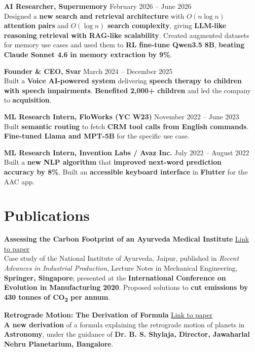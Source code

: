 \documentclass[letterpaper,10pt]{article}
\newcommand{\entry}[3]{%
  \textbf{#1} \hfill #2 \\[1pt]
  #3\par\vspace{2pt}}
\begin{document}
\entry{AI Researcher, Supermemory}{February 2026 -- June 2026}{%
Designed a \textbf{new search and retrieval architecture} with \textbf{$O(n \log n)$ attention pairs} and \textbf{$O(\log n)$ search complexity}, giving \textbf{LLM-like reasoning retrieval with RAG-like scalability}. Created augmented datasets for memory use cases and used them to \textbf{RL fine-tune Qwen3.5 8B}, \textbf{beating Claude Sonnet 4.6 in memory extraction by 9\%}.}

\entry{Founder \& CEO, Svar}{March 2024 -- December 2025}{%
Built a \textbf{Voice AI-powered system} delivering \textbf{speech therapy to children with speech impairments}. \textbf{Benefited 2,000+ children} and led the company to \textbf{acquisition}.}

\entry{ML Research Intern, FloWorks (YC W23)}{November 2022 -- June 2023}{%
Built \textbf{semantic routing} to fetch \textbf{CRM tool calls from English commands}. \textbf{Fine-tuned Llama and MPT-5B} for the specific use case.}

\entry{ML Research Intern, Invention Labs / Avaz Inc.}{July 2022 -- August 2022}{%
Built a \textbf{new NLP algorithm} that \textbf{improved next-word prediction accuracy by 8\%}. Built an \textbf{accessible keyboard interface} in \textbf{Flutter} for the AAC app.}

\section{Publications}

\entry{Assessing the Carbon Footprint of an Ayurveda Medical Institute}{\href{https://doi.org/10.1007/978-981-16-5281-3_4}{Link to paper}}{%
Case study of the National Institute of Ayurveda, Jaipur, published in \textit{Recent Advances in Industrial Production}, Lecture Notes in Mechanical Engineering, \textbf{Springer, Singapore}; presented at the \textbf{International Conference on Evolution in Manufacturing 2020}. Proposed solutions to \textbf{cut emissions by 430 tonnes of CO\textsubscript{2} per annum}.}

\entry{Retrograde Motion: The Derivation of Formula}{\href{https://insa.nic.in/writereaddata/UpLoadedFiles/IJHS/Vol55_4_2020__Art08.pdf}{Link to paper}}{%
\textbf{A new derivation} of a formula explaining the retrograde motion of planets in \textbf{Astronomy}, under the guidance of \textbf{Dr. B. S. Shylaja, Director, Jawaharlal Nehru Planetarium, Bangalore}.}
\end{document}
